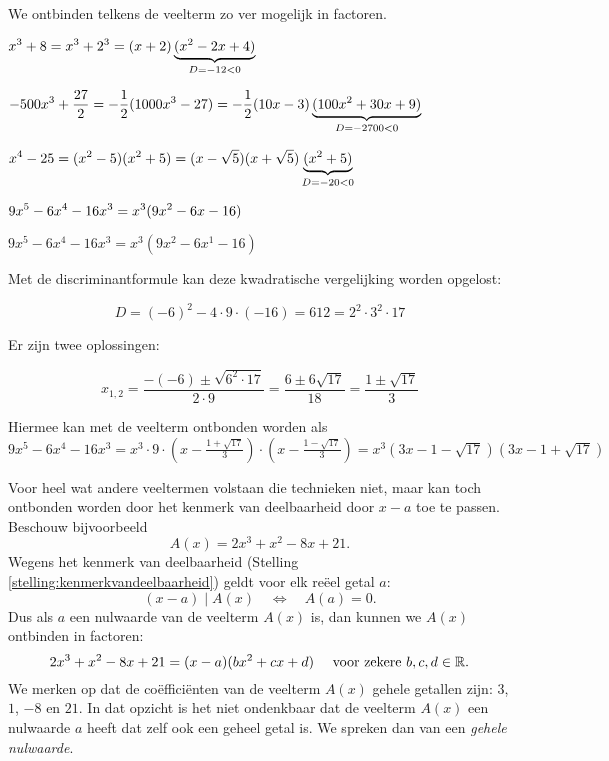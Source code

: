 \documentclass{ximera}
\begin{document}
\begin{example} 
We ontbinden telkens de veelterm zo ver mogelijk in factoren. 

\begin{question} \( \displaystyle x^3 + 8 = x^3 + 2^3 = (x+2)\underbrace{(x^2-2x+4)}_{D = -12 < 0}                                                         \) \end{question}
\begin{question} \( \displaystyle -500x^3 + \frac{27}{2} = -\frac{1}{2}(1000x^3 - 27) = -\frac{1}{2}(10x-3)\underbrace{(100x^2 + 30x + 9)}_{D = -2700 < 0} \) \end{question}
\begin{question} \( \displaystyle x^4-25 = (x^2 - 5)(x^2+5) = (x-\sqrt{5})(x+\sqrt{5})\underbrace{(x^2+5)}_{D = -20 < 0}                                   \) \end{question}
\begin{question} \( \displaystyle 9x^5 - 6x^4 - 16x^3 = x^3(9x^2-6x-16)                                                                                    \) \end{question}
\begin{question} \( 9x^5 - 6x^4 - 16x^3 = x^3(9x^2 - 6x^1 - 16) \)              

Met de discriminantformule kan deze kwadratische vergelijking worden opgelost: 

\[
D = (-6)^2-4\cdot 9 \cdot (-16) = 612 = 2^2 \cdot 3^2 \cdot 17 
\]

Er zijn twee oplossingen: 

\[
x_{1,2} = \frac{-(-6) \pm \sqrt{6^2 \cdot 17}}{2 \cdot 9} = \frac{6 \pm 6\sqrt{17}}{18} = \frac{1 \pm \sqrt{17}}{3} 
\]

Hiermee kan met de veelterm ontbonden worden als \(9x^5 - 6x^4 - 16x^3 = x^3 \cdot 9 \cdot \left(x-\frac{1+\sqrt{17}}{3}\right)\cdot\left(x-\frac{1-\sqrt{17}}{3}\right) = x^3(3x-1-\sqrt{17})(3x-1+\sqrt{17})\)

\end{question}
\end{example} 

Voor heel wat andere veeltermen volstaan die technieken niet, maar kan toch ontbonden worden door het kenmerk van deelbaarheid door $x-a$ toe te passen. Beschouw bijvoorbeeld
\[
A(x) = 2x^3 +x^2 - 8x + 21.
\]
Wegens het kenmerk van deelbaarheid (Stelling \ref{stelling:kenmerkvandeelbaarheid}) geldt voor elk reëel getal $a$: 
\[
(x-a) \mid A(x) \quad \Leftrightarrow \quad A(a) = 0. 
\]
Dus als $a$ een nulwaarde van de veelterm $A(x)$ is, dan kunnen we $A(x)$ ontbinden in factoren:
\[
2x^3 +x^2 - 8x + 21 = (x-a)(bx^2 + cx + d) %
\quad 
\text{ voor zekere } b,c,d \in \R.
\]
We merken op dat de coëfficiënten van de veelterm $A(x)$ gehele getallen zijn: $3$, $1$, $-8$ en $21$. In dat opzicht is het niet ondenkbaar dat de veelterm $A(x)$ een nulwaarde $a$ heeft dat zelf ook een geheel getal is. We spreken dan van een \textit{ gehele nulwaarde}.
\end{document}
